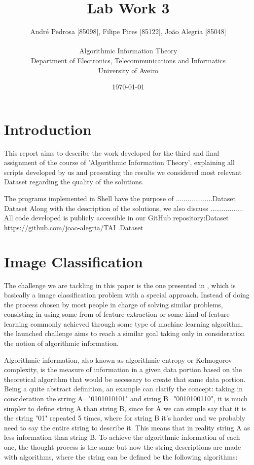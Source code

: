 \documentclass[12pt]{article}
\title{Lab Work 3}
\author
{André Pedrosa [85098], Filipe Pires [85122], João Alegria [85048]\\
\\
Algorithmic Information Theory\\
\normalsize{Department of Electronics, Telecommunications and Informatics}\\
\normalsize{University of Aveiro}\\
}
\date{\today{}}
\begin{document}
 

\baselineskip18pt

\maketitle 

\section{Introduction}
This report aims to describe the work developed for the third and final assignment
of the course of 'Algorithmic Information Theory', explaining all scripts
developed by us and presenting the results we considered most relevant Dataset
regarding the quality of the solutions. 

The programs implemented in Shell have the purpose of ...................Dataset
Dataset
Along with the description of the solutions, we also discuss .................
All code developed is publicly accessible in our GitHub repository:Dataset
\url{https://github.com/joao-alegria/TAI} .Dataset
\newpage

\section{Image Classification}
The challenge we are tackling in this paper is the one presented in \cite{trab3}, which is basically a image classification problem with a special approach. Instead of doing the process chosen by most people in charge of solving similar problems, consisting in using some from of feature extraction or some kind of feature learning commonly achieved through some type of machine learning algorithm, the launched challenge aims to reach a similar goal taking only in consideration the notion of algorithmic information.

Algorithmic information, also known as algorithmic entropy or Kolmogorov complexity, is the measure of information in a given data portion based on the theoretical algorithm that would be necessary to create that same data portion. Being a quite abstract definition, an example can clarify the concept: taking in consideration the string A="0101010101" and string B="0010100110", it is much simpler to define string A than string B, since for A we can simple say that it is the string "01" repeated 5 times, where for string B it's harder and we probably need to say the entire string to describe it. This means that in reality string A as less information than string B. To achieve the algorithmic information of each one, the thought process is the same but now the string descriptions are made with algorithms, where the string can be defined be the following algorithms:
\end{document}
